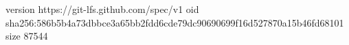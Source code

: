 version https://git-lfs.github.com/spec/v1
oid sha256:586b5b4a73dbbce3a65bb2fdd6cde79dc90690699f16d527870a15b46fd68101
size 87544
